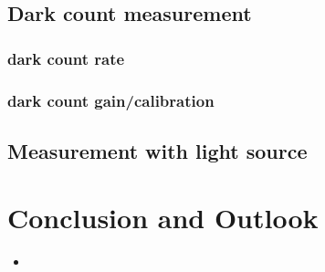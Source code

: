 \section{Dark count measurement}

\subsection{dark count rate}

\subsection{dark count gain/calibration}


\section{Measurement with light source}



\chapter{Conclusion and Outlook}


\begin{itemize}
    \item 
\end{itemize}